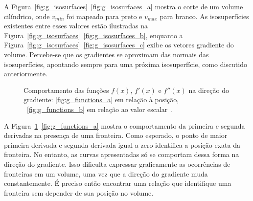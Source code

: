 	A Figura~\ref{fig:g_isosurfaces}~\ref{fig:g_isosurfaces_a} mostra o corte de um volume cilíndrico, onde $v_{min}$ foi mapeado para preto e $v_{max}$ para branco. As isosuperfícies existentes entre esses valores estão ilustradas na Figura~\ref{fig:g_isosurfaces}~\ref{fig:g_isosurfaces_b}, enquanto a Figura~\ref{fig:g_isosurfaces}~\ref{fig:g_isosurfaces_c} exibe os vetores gradiente do volume. Percebe-se que os gradientes se aproximam das normais das isosuperfícies, apontando sempre para uma próxima isosuperfície, como discutido anteriormente.
		
\begin{figure}[h]
	\centering
	\caption{Comportamento das funções $f(x)$, $f'(x)$ e $f''(x)$ na direção do gradiente: \ref{fig:g_functions_a} em relação à posição, ~\ref{fig:g_functions_b} em relação ao valor escalar~\cite{gordon}.}
	\label{fig:g_functions}
\end{figure}
	
	A Figura~\ref{fig:g_functions}~\ref{fig:g_functions_a} mostra o comportamento da primeira e segunda derivadas na presença de uma fronteira. Como esperado, o ponto de maior primeira derivada e segunda derivada igual a zero identifica a posição exata da fronteira. No entanto, as curvas apresentadas só se comportam dessa forma na direção do gradiente. Isso dificulta expressar graficamente as ocorrências de fronteiras em um volume, uma vez que a direção do gradiente muda constantemente. É preciso então encontrar uma relação que identifique uma fronteira sem depender de sua posição no volume. 
	
